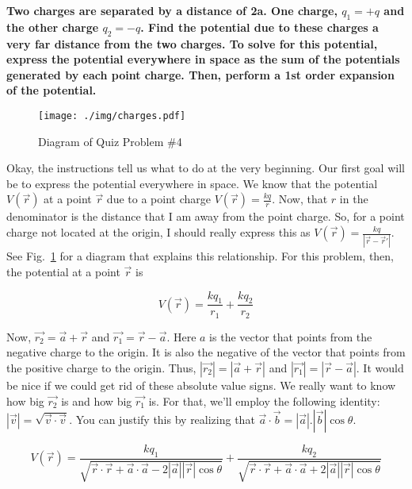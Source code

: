\begin{homeworkProblem}[Quiz 4]
    \textbf{Two charges are separated by a distance of 2a. One charge,
    $q_1 = +q$ and the other charge $q_2 = -q$. Find the potential due
    to these charges a very far distance from the two charges. To solve
    for this potential, express the potential everywhere in space as the
    sum of the potentials generated by each point charge. Then, perform
    a 1st order expansion of the potential.}
    \\

    \begin{figure}[t]
        \centering
        \texttt{[image: ./img/charges.pdf]}
        \caption{Diagram of Quiz Problem \#4}
        \label{fig:charges.pdf}
    \end{figure}

    Okay, the instructions tell us what to do at the very beginning. Our
    first goal will be to express the potential everywhere in space. We
    know that the potential $V(\vec{r})$ at a point $\vec{r}$ due to a
    point charge $V(\vec{r}) = \frac{k q}{r} $. Now, that $r$ in the
    denominator is the distance that I am away from the point charge.
    So, for a point charge not located at the origin, I should really
    express this as $V(\vec{r}) = \frac{kq}{|\vec{r}-\vec{r}'|}$. See
    Fig.~\ref{fig:charges.pdf} for a diagram that explains this relationship.
    For this problem, then, the potential at a point $\vec{r}$ is

    \[
    V(\vec{r}) = \frac{k q_1}{r_1} + \frac{k q_2}{r_2}
    \]

    Now, $\vec{r_2}=\vec{a}+\vec{r}$ and $\vec{r_1}=\vec{r}-\vec{a}$.
    Here $a$ is the vector that points from the negative charge to the
    origin. It is also the negative of the vector that points from the
    positive charge to the origin. Thus, $|\vec{r_2}|=|\vec{a}+\vec{r}|$
    and $|\vec{r_1}| = |\vec{r}-\vec{a}|$. It would be nice if we could
    get rid of these absolute value signs. We really want to know how
    big $\vec{r_2}$ is and how big $\vec{r_1}$ is. For that, we'll
    employ the following identity: $|\vec{v}|=
    \sqrt{\vec{v}\cdot\vec{v}}$. You can justify this by realizing that
    $\vec{a}\cdot\vec{b}=|\vec{a}|.  |\vec{b}|\cos\theta$.

    \[
    V(\vec{r}) = \frac{k
    q_1}{\sqrt{\vec{r}\cdot\vec{r}+\vec{a}\cdot\vec{a}-2|\vec{a}||\vec{r}|\cos\theta}}
    + \frac{k
    q_2}{\sqrt{\vec{r}\cdot\vec{r}+\vec{a}\cdot\vec{a}+2|\vec{a}||\vec{r}|\cos\theta}}
    \]


\end{homeworkProblem}
